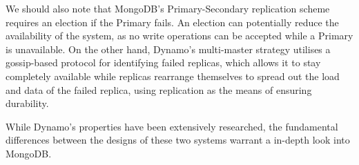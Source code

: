 We should also note that MongoDB's Primary-Secondary replication scheme requires an election if the Primary fails. An election can potentially reduce the availability of the system, as no write operations can be accepted while a Primary is unavailable. On the other hand, Dynamo's multi-master strategy utilises a gossip-based protocol for identifying failed replicas, which allows it to stay completely available while replicas rearrange themselves to spread out the load and data of the failed replica, using replication as the means of ensuring durability.

While Dynamo's properties have been extensively researched, the fundamental differences between the designs of these two systems warrant a in-depth look into MongoDB.